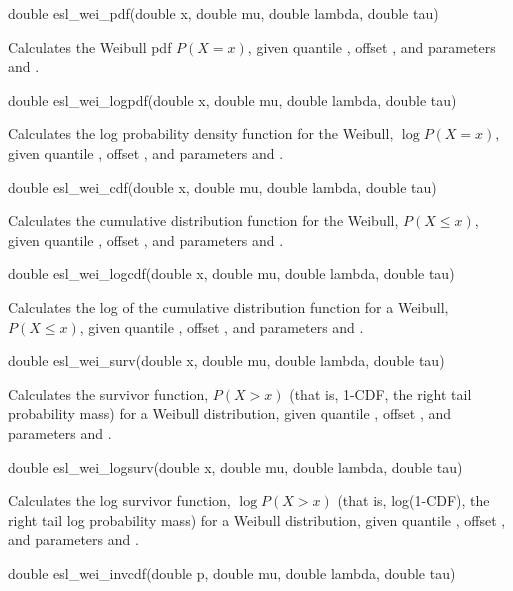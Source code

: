 \begin{sreapi}
\hypertarget{func:esl_wei_pdf()}
{\item[double esl\_wei\_pdf(double x, double mu, double lambda, double tau)]}

Calculates the Weibull pdf $P(X=x)$, given quantile ,
offset , and parameters  and .


\hypertarget{func:esl_wei_logpdf()}
{\item[double esl\_wei\_logpdf(double x, double mu, double lambda, double tau)]}

Calculates the log probability density function for the
Weibull, $\log P(X=x)$, given quantile ,
offset , and parameters  and .


\hypertarget{func:esl_wei_cdf()}
{\item[double esl\_wei\_cdf(double x, double mu, double lambda, double tau)]}

Calculates the cumulative distribution function for the
Weibull, $P(X \leq x)$, given quantile ,
offset , and parameters  and .


\hypertarget{func:esl_wei_logcdf()}
{\item[double esl\_wei\_logcdf(double x, double mu, double lambda, double tau)]}

Calculates the log of the cumulative distribution function for a
Weibull, $P(X \leq x)$, given quantile ,
offset , and parameters  and .


\hypertarget{func:esl_wei_surv()}
{\item[double esl\_wei\_surv(double x, double mu, double lambda, double tau)]}

Calculates the survivor function, $P(X>x)$ (that is, 1-CDF,
the right tail probability mass) for a Weibull
distribution, given quantile , offset , and parameters
 and .


\hypertarget{func:esl_wei_logsurv()}
{\item[double esl\_wei\_logsurv(double x, double mu, double lambda, double tau)]}

Calculates the log survivor function, $\log P(X>x)$ (that is, 
log(1-CDF), the right tail log probability mass) for a 
Weibull distribution, given quantile , offset ,
and parameters  and .


\hypertarget{func:esl_wei_invcdf()}
{\item[double esl\_wei\_invcdf(double p, double mu, double lambda, double tau)]}


\end{sreapi}
